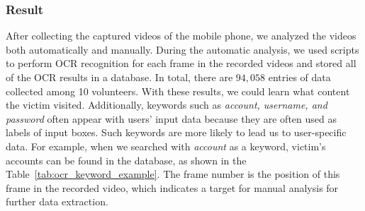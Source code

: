 \subsubsection{Result}

After collecting the captured videos of the mobile phone, we analyzed the videos both automatically and manually.
During the automatic analysis, we used scripts to perform OCR recognition for each frame in the recorded videos and stored all of the OCR results in a database.
In total, there are $94,058$ entries of data collected among 10 volunteers.
With these results, we could learn what content the victim visited.
Additionally, keywords such as \textit{account, username, and password} often appear with users' input data because they are often used as labels of input boxes.
Such keywords are more likely to lead us to user-specific data.
For example, when we searched with \textit{account} as a keyword, victim's accounts can be found in the database, as shown in the Table~\ref{tab:ocr_keyword_example}.
The frame number is the position of this frame in the recorded video, which indicates a target for manual analysis for further data extraction.

